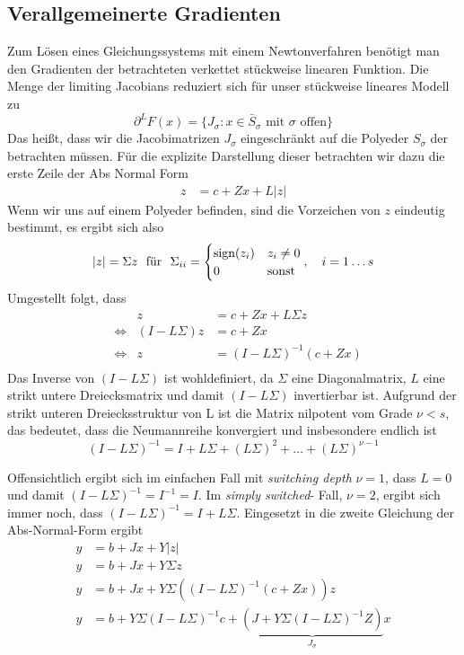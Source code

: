 \subsection{Verallgemeinerte Gradienten}

Zum Lösen eines Gleichungssystems mit einem Newtonverfahren benötigt man den Gradienten der betrachteten verkettet stückweise linearen Funktion. 
Die Menge der limiting Jacobians reduziert sich für unser stückweise lineares Modell zu 
\[
 \partial^L F(x) = \lbrace J_\sigma: x\in \bar S_\sigma \text{ mit }\sigma \text{ offen} \rbrace
\]
Das heißt, dass wir die Jacobimatrizen $J_\sigma$ eingeschränkt auf die Polyeder $S_\sigma$ der betrachten müssen.
Für die explizite Darstellung dieser betrachten wir dazu die erste Zeile der Abs Normal Form
\begin{align*}
	z &= c+ Zx + L|z|
\end{align*}
Wenn wir uns auf einem Polyeder befinden, sind die Vorzeichen von $z$ eindeutig bestimmt, es ergibt sich also  
\begin{align*}
|z| = \Sigma z~ \text{ für }~\Sigma_{ii} =\begin{cases} 
\text{sign}(z_i) & z_i\neq 0\\
0 & \text{sonst}
 \end{cases},\quad i=1\ldots s
\end{align*}
Umgestellt folgt, dass 
\begin{align*}
&&z &= c+ Zx + L\Sigma z\\
&\iff & (I-L\Sigma)z &= c+ Zx \\
&\iff & z &= (I-L\Sigma)^{-1}(c+ Zx)\\
\end{align*}
Das Inverse von $(I-L\Sigma)$ ist wohldefiniert, da $\Sigma$ eine Diagonalmatrix, $L$ eine strikt untere Dreiecksmatrix und damit $(I-L\Sigma)$ invertierbar ist. 
Aufgrund der strikt unteren Dreiecksstruktur von L ist die Matrix nilpotent vom Grade $\nu<s$, das bedeutet, dass die Neumannreihe konvergiert und insbesondere endlich ist
\[
(I-L\Sigma)^{-1} = I+L\Sigma + (L\Sigma)^2 + \ldots + (L\Sigma)^{\nu -1}
\] 

Offensichtlich ergibt sich im einfachen Fall mit \textit{switching depth} $\nu = 1$, dass $L=0$ und damit $(I-L\Sigma)^{-1} = I^{-1} = I$. Im \textit{simply switched}- Fall, $\nu=2$, ergibt sich immer noch, dass $(I-L\Sigma)^{-1} =I+L\Sigma$.
Eingesetzt in die zweite Gleichung der Abs-Normal-Form ergibt
\begin{align*}
y &= b+Jx + Y|z|\\
y &= b+Jx + Y\Sigma z\\
y &= b+ Jx + Y\Sigma ((I-L\Sigma)^{-1}(c+ Zx))z\\
y &= b + Y\Sigma(I-L\Sigma)^{-1}c+\underbrace{(J+Y\Sigma(I-L\Sigma)^{-1}Z)}_{J_\sigma}x \\
\end{align*}

